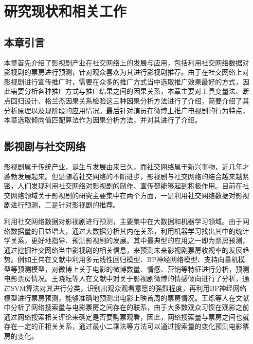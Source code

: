 \chapter{研究现状和相关工作}

\section{本章引言}

本章首先介绍了影视剧产业在社交网络上的发展与应用，包括利用社交网络数据对影视剧的票房进行预测，针对观众喜欢为其进行影视剧推荐。由于在社交网络上对影视剧进行宣传推广时，需要在众多的推广方式当中选取推广效果最好的方式，因此需要分析各种推广方式与推广结果之间的因果关系，本章主要对工具变量法、断点回归设计、格兰杰因果关系检验这三种因果分析方法进行了介绍，简要介绍了其分析原理以及现阶段的应用情况。最后针对演员在微博上推广电视剧的行为特点，本章选取倾向值匹配算法作为因果分析方法，并对其进行了介绍。

\section{影视剧与社交网络}

影视剧属于传统产业，诞生与发展由来已久，而社交网络属于新兴事物，近几年才蓬勃发展起来。但是随着社交网络的不断进步，影视剧与社交网络的结合越来越紧密，人们发现利用社交网络对影视剧的制作、宣传都能够起到积极作用。目前在社交网络领域关于影视剧的研究主要集中在两个方面，一是利用社交网络数据对影视剧进行预测，二是针对影视剧的推荐。

利用社交网络数据对影视剧进行预测，主要集中在大数据和机器学习领域。由于网络数据量的日益增大，通过大数据分析其内在关系，利用机器学习找出其中的统计学关系，更好地指导、预测影视剧的发展。其中最典型的应用之一即为票房预测，通过挖掘社交网络当中影视剧的相关信息，来预测未来影视剧票房收视率的发展趋势。例如王伟在文献\cite{王伟2015基于微博数据的电影票房预测研究}中利用多元线性回归模型、BP神经网络模型、支持向量机模型等预测模型，对微博上关于电影的微博数量、情感、营销等特征进行分析，预测电影票房情况。王晓耘等人在文献\cite{王晓耘2016基于微博的电影首映周票房预测建模}中对关于影视剧微博的情感倾向进行了分析，通过SVM算法对其进行分类，识别出观众观看意愿的强烈程度，再利用BP神经网络模型进行票房预测，能够准确地预测出电影上映首周的票房情况。王烁等人在文献\cite{王炼2014基于网络搜索的票房预测模型}中分析了网络搜索量与电影票房之间存在的联系，由于大多数观众习惯在观影之前通过网络搜索相关评论来确定是否要购票观看，因此，网络搜索量与票房之间也就存在一定的正相关关系，通过最小二乘法等方法可以通过搜索量的变化预测电影票房的变化。

